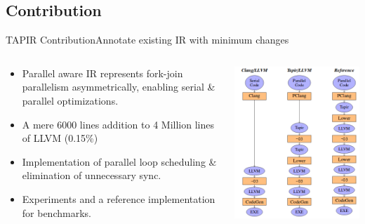 \documentclass{beamer}
\begin{document}
\subsection{Contribution}
\begin{frame}{TAPIR Contribution}{Annotate existing IR with minimum changes}
\begin{columns}[T]
  \begin{column}{0.7\textwidth}
\begin{itemize}
    \item Parallel aware IR represents fork-join parallelism asymmetrically, enabling serial \& parallel optimizations.
    \item A mere 6000 lines addition to 4 Million lines of LLVM (0.15\%)
    \item Implementation of parallel loop scheduling \& elimination of unnecessary sync.
    \item Experiments and a reference implementation for benchmarks.
\end{itemize}
\end{column}
  \begin{column}{0.3\textwidth}
  \includegraphics[scale=.25]{llvm}
  \end{column}
\end{columns} 
\end{frame}
\end{document}
